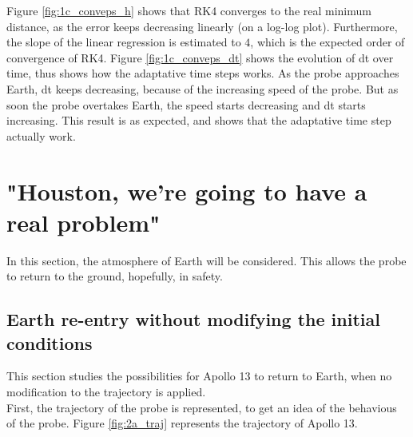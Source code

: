 \documentclass[a4paper,12pt,twoside]{article}
\begin{document}
Figure \ref{fig:1c_conveps_h} shows that RK4 converges to the real minimum distance, as the error keeps decreasing linearly (on a log-log plot).
Furthermore, the slope of the linear regression is estimated to $4$, which is the expected order of convergence of RK4.
Figure \ref{fig:1c_conveps_dt} shows the evolution of dt over time, thus shows how the adaptative time steps works.
As the probe approaches Earth, dt keeps decreasing, because of the increasing speed of the probe.
But as soon the probe overtakes Earth, the speed starts decreasing and dt starts increasing.
This result is as expected, and shows that the adaptative time step actually work.

\section{"Houston, we're going to have a real problem"}
In this section, the atmosphere of Earth will be considered.
This allows the probe to return to the ground, hopefully, in safety.

\subsection{Earth re-entry without modifying the initial conditions}
This section studies the possibilities for Apollo 13 to return to Earth, when no modification to the trajectory is applied.\\

First, the trajectory of the probe is represented, to get an idea of the behavious of the probe.
Figure \ref{fig:2a_traj} represents the trajectory of Apollo 13.
\end{document}
